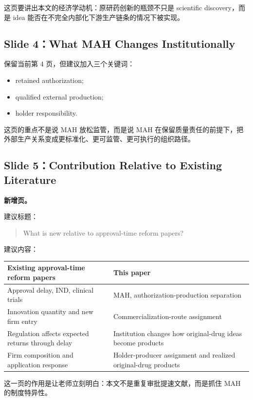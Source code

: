 \documentclass[12pt]{ctexart}
\begin{document}
这页要讲出本文的经济学动机：原研药创新的瓶颈不只是 scientific discovery，而是 idea 能否在不完全内部化下游生产链条的情况下被实现。

\subsection{Slide 4：What MAH Changes Institutionally}

保留当前第 4 页，但建议加入三个关键词：
\begin{itemize}
    \item retained authorization;
    \item qualified external production;
    \item holder responsibility.
\end{itemize}

这页的重点不是说 MAH 放松监管，而是说 MAH 在保留质量责任的前提下，把外部生产关系变成更标准化、更可监管、更可执行的组织路径。

\subsection{Slide 5：Contribution Relative to Existing Literature}

\textbf{新增页。}

建议标题：
\begin{quote}
What is new relative to approval-time reform papers?
\end{quote}

建议内容：
\begin{center}
\begin{tabularx}{0.95\textwidth}{Y Y}
\toprule
Existing approval-time reform papers & This paper \\
\midrule
Approval delay, IND, clinical trials & MAH, authorization-production separation \\
Innovation quantity and new firm entry & Commercialization-route assignment \\
Regulation affects expected returns through delay & Institution changes how original-drug ideas become products \\
Firm composition and application response & Holder-producer assignment and realized original-drug products \\
\bottomrule
\end{tabularx}
\end{center}

这一页的作用是让老师立刻明白：本文不是重复审批提速文献，而是抓住 MAH 的制度特异性。
\end{document}
